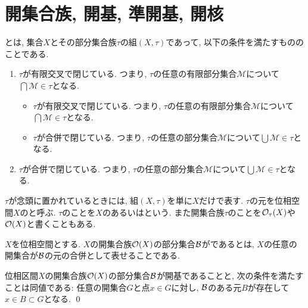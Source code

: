 \documentclass[uplatex, dvipdfmx, a4paper, 12pt, class=jsbook, crop=false]{standalone}
\begin{document}
\section{開集合族, 開基, 準開基, 開核}
\label{sec:open-sets}

\newcommand{\cM}{\mathcal{M}}

\begin{definition}
	とは, 集合$X$とその部分集合族$\tau$の組$(X, \tau)$であって, 以下の条件を満たすもののことである.
	\begin{enumerate}
		\item$\tau$が有限交叉で閉じている.
			つまり, $\tau$の任意の有限部分集合$\mathscr{M}$について$\bigcap \mathscr{M} \in \tau$となる.
			\begin{itemize}
				\item$\tau$が有限交叉で閉じている.
					つまり, $\tau$の任意の有限部分集合$\mathscr{M}$について$\bigcap \mathscr{M} \in \tau$となる.
				\item$\tau$が合併で閉じている.
					つまり, $\tau$の任意の部分集合$\mathscr{M}$について$\bigcup \mathscr{M} \in \tau$となる.
			\end{itemize}
		\item$\tau$が合併で閉じている.
			つまり, $\tau$の任意の部分集合$\mathscr{M}$について$\bigcup \mathscr{M} \in \tau$となる.
	\end{enumerate}
	$\tau$が念頭に置かれているときには, 組$(X, \tau)$を単に$X$だけで表す.
	$\tau$の元を位相空間$X$のと呼ぶ.
	$\tau$のことを$X$のあるいはという.
	また開集合族$\tau$のことを$\topopens_\tau (X)$や$\topopens[X]$と書くこともある.
\end{definition}

\begin{definition}
	$X$を位相空間とする.
	$X$の開集合族$\topopens[X]$の部分集合$\mathcal{B}$がであるとは, $X$の任意の開集合が$\mathcal{B}$の元の合併として表せることである.
\end{definition}

\begin{proposition}
	位相区間$X$の開集合族$\topopens[X]$の部分集合$\mathcal{B}$が開基であることと, 次の条件を満たすことは同値である: 任意の開集合$G$と点$x \in G$に対し, $\mathcal{B}$のある元$B$が存在して$x \in B \subset G$となる.
	\qed
\end{proposition}
\end{document}
